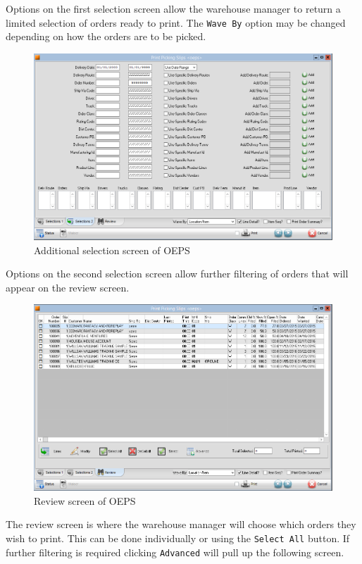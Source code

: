 Options on the first selection screen allow the warehouse manager to return a limited selection of orders ready to print. The \texttt{Wave By} option may be changed depending on how the orders are to be picked.

\begin{figure}[H]
	\includegraphics[width=\textwidth]{../img/image2}
	\caption{Additional selection screen of OEPS}
\end{figure}

Options on the second selection screen allow further filtering of orders that will appear on the review screen.

\begin{figure}[H]
	\includegraphics[width=\textwidth]{../img/image3}
	\caption{Review screen of OEPS}
\end{figure}

The review screen is where the warehouse manager will choose which orders they wish to print.  This can be done individually or using the \texttt{Select All} button. If further filtering is required clicking \texttt{Advanced} will pull up the following screen.

